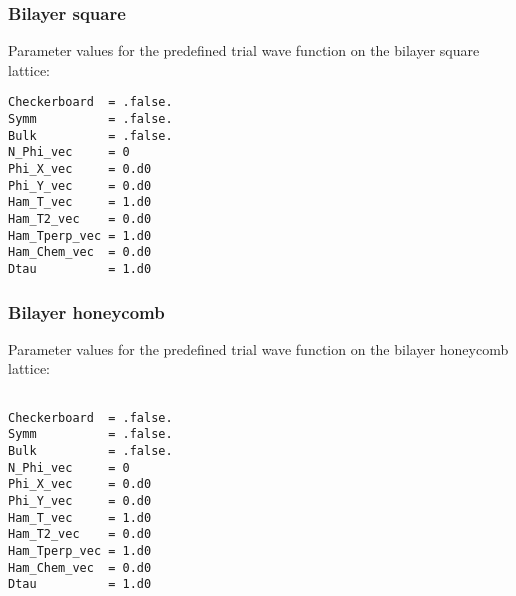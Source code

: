 \subsubsection{Bilayer square}

Parameter values for the predefined trial wave function on the bilayer square lattice:
\begin{lstlisting}[style=fortran]
Checkerboard  = .false.
Symm          = .false.
Bulk          = .false.
N_Phi_vec     = 0
Phi_X_vec     = 0.d0
Phi_Y_vec     = 0.d0
Ham_T_vec     = 1.d0
Ham_T2_vec    = 0.d0
Ham_Tperp_vec = 1.d0
Ham_Chem_vec  = 0.d0
Dtau          = 1.d0
\end{lstlisting}


\subsubsection{Bilayer honeycomb}

Parameter values for the predefined trial wave function on the bilayer honeycomb lattice:
\begin{lstlisting}[style=fortran]

Checkerboard  = .false.
Symm          = .false.
Bulk          = .false.
N_Phi_vec     = 0
Phi_X_vec     = 0.d0
Phi_Y_vec     = 0.d0
Ham_T_vec     = 1.d0
Ham_T2_vec    = 0.d0
Ham_Tperp_vec = 1.d0
Ham_Chem_vec  = 0.d0
Dtau          = 1.d0
\end{lstlisting}

